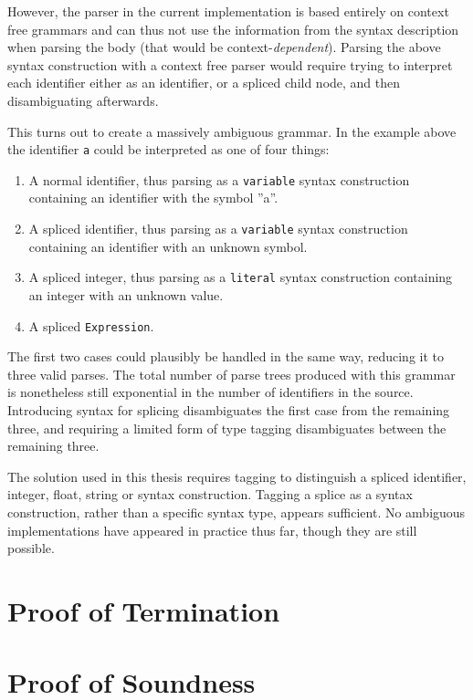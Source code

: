 \documentclass{kththesis}
\begin{document}
However, the parser in the current implementation is based entirely on context free grammars and can thus not use the information from the syntax description when parsing the body (that would be context-\emph{dependent}). Parsing the above syntax construction with a context free parser would require trying to interpret each identifier either as an identifier, or a spliced child node, and then disambiguating afterwards.

This turns out to create a massively ambiguous grammar. In the example above the identifier \texttt{a} could be interpreted as one of four things:
\begin{enumerate}
  \item A normal identifier, thus parsing as a \texttt{variable} syntax construction containing an identifier with the symbol ''a''.
  \item A spliced identifier, thus parsing as a \texttt{variable} syntax construction containing an identifier with an unknown symbol.
  \item A spliced integer, thus parsing as a \texttt{literal} syntax construction containing an integer with an unknown value.
  \item A spliced \texttt{Expression}.
\end{enumerate}

The first two cases could plausibly be handled in the same way, reducing it to three valid parses. The total number of parse trees produced with this grammar is nonetheless still exponential in the number of identifiers in the source. Introducing syntax for splicing disambiguates the first case from the remaining three, and requiring a limited form of type tagging disambiguates between the remaining three.

The solution used in this thesis requires tagging to distinguish a spliced identifier, integer, float, string or syntax construction. Tagging a splice as a syntax construction, rather than a specific syntax type, appears sufficient. No ambiguous implementations have appeared in practice thus far, though they are still possible.

\section{Proof of Termination} \label{sec:proof-termination}

\section{Proof of Soundness} \label{sec:proof-no-errors}
\end{document}
